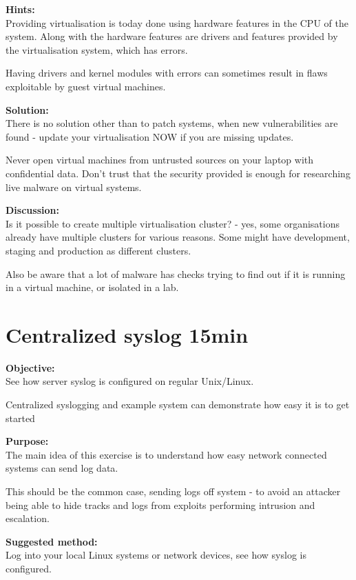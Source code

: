 \documentclass[a4paper,11pt,notitlepage]{report}
\begin{document}
{\bf Hints:}\\
Providing virtualisation is today done using hardware features in the CPU of the system. Along with the hardware features are drivers and features provided by the virtualisation system, which has errors.

Having drivers and kernel modules with errors can sometimes result in flaws exploitable by guest virtual machines.

{\bf Solution:}\\
There is no solution other than to patch systems, when new vulnerabilities are found - update your virtualisation NOW if you are missing updates.

Never open virtual machines from untrusted sources on your laptop with confidential data. Don't trust that the security provided is enough for researching live malware on virtual systems.

{\bf Discussion:}\\
Is it possible to create multiple virtualisation cluster? - yes, some organisations already have multiple clusters for various reasons. Some might have development, staging and production as different clusters.

Also be aware that a lot of malware has checks trying to find out if it is running in a virtual machine, or isolated in a lab.



\chapter{Centralized syslog 15min}
\label{ex:centralized-syslog-practical}

{\bf Objective:} \\
See how server syslog is configured on regular Unix/Linux.

Centralized syslogging and example system can demonstrate how easy it is to get started

{\bf Purpose:}\\
The main idea of this exercise is to understand how easy network connected systems can send log data.

This should be the common case, sending logs off system - to avoid an attacker being able to hide tracks and logs from exploits performing intrusion and escalation.

{\bf Suggested method:}\\
Log into your local Linux systems or network devices, see how syslog is configured.
\end{document}

